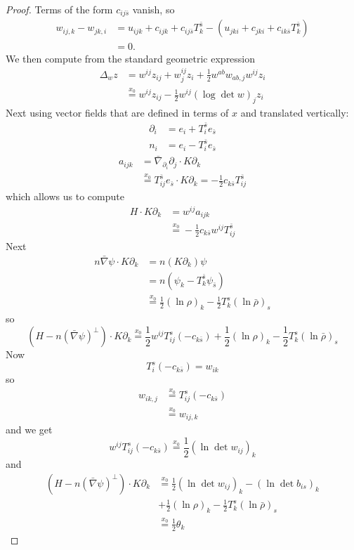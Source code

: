 \documentclass[12pt,letterpaper]{amsart}%
\numberwithin{mycounter}{section}
\theoremstyle{plain}
\numberwithin{equation}{section}
\theoremstyle{definition}
\begin{document}
\begin{proof}
Terms of the form $c_{ij\bar{s}}$ vanish, so
\begin{align*}
w_{ij,k}-w_{jk,i}  & =u_{ijk}+c_{ijk}+c_{ij\bar{s}}T_{k}^{\bar{s}}%
-(u_{jki}+c_{jki}+c_{ik\bar{s}}T_{k}^{\bar{s}})\\
& =0.
\end{align*}
We then compute from the standard geometric expression
\begin{align*}
\Delta_{w}z  & =w^{ij}z_{ij}+w_{j}^{ij}z_{i}+\frac{1}{2}w^{ab}w_{ab,j}%
w^{ij}z_{i}\\
& \overset{x_0}{=}w^{ij}z_{ij}-\frac{1}{2}w^{ij}\left(  \log\det w\right)  _{j}z_{i}%
\end{align*}
Next using vector fields that are
defined in terms of $x$ and translated vertically:
\begin{align*}
\partial_{i}  &  =e_{i}+T_{i}^{\bar{s}}e_{\bar{s}}\\
n_{i}  &  =e_{i}-T_{i}^{\bar{s}}e_{\bar{s}}%
\end{align*}
\begin{align*}
a_{ijk}  & =\bar{\nabla}_{\partial_{i}}\partial_{j}\cdot K\partial_{k}\\
& \overset{x_0}{=} T_{ij}^{\bar{s}}e_{\bar{s}}\cdot K\partial_{k}=-\frac{1}{2}c_{k\bar{s}%
}T_{ij}^{\bar{s}}%
\end{align*}
which allows us to compute
\begin{align*}
H\cdot K\partial_{k}  & =w^{ij}a_{ijk}\\
& \overset{x_0}{=}-\frac{1}{2}c_{k\bar{s}}w^{ij}T_{ij}^{\bar{s}}%
\end{align*}
Next%
\begin{align*}
n\bar{\nabla}\psi\cdot K\partial_{k}  & =n\left(  K\partial_{k}\right)
\psi\\
& =n\left(  \psi_{k}-T_{k}^{\bar{s}}\psi_{\bar{s}}\right)  \\
& \overset{x_0}{=}\frac{1}{2}\left(  \ln\rho\right)  _{k}-\frac{1}{2}T_{k}^{s}\left(  \ln
\bar{\rho}\right)  _{s}%
\end{align*}
so
\[
\left(  H-n\left(  \bar{\nabla}\psi\right)  ^{\perp}\right)  \cdot
K\partial_{k}\overset{x_0}{=}\frac{1}{2}w^{ij}T_{ij}^{s}(-c_{k\bar{s}})+\frac{1}{2}\left(
\ln\rho\right)  _{k}-\frac{1}{2}T_{k}^{s}\left(  \ln\bar{\rho}\right)  _{s}%
\]
Now
\[
T_{i}^{s}(-c_{k\bar{s}})=w_{ik}%
\]
so
\begin{align*}
w_{ik,j}  & \overset{x_0}{=}T_{ij}^{s}(-c_{k\bar{s}})\\
& \overset{x_0}{=}w_{ij,k}%
\end{align*}
and we get
\[
w^{ij}T_{ij}^{s}(-c_{k\bar{s}})\overset{x_0}{=}\frac{1}{2}\left(  \ln\det w_{ij}\right)  _{k}%
\]
and
\begin{align*}
\left(  H-n\left(  \bar{\nabla}\psi\right)  ^{\perp}\right)  \cdot
K\partial_{k}  & \overset{x_0}{=}\frac{1}{2}\left(  \ln\det w_{ij}\right)  _{k}-\left(
\ln\det b_{is}\right)  _{k}\\
& +\frac{1}{2}\left(  \ln\rho\right)  _{k}-\frac{1}{2}T_{k}^{s}\left(  \ln
\bar{\rho}\right)  _{s}\\
& \overset{x_0}{=}\frac{1}{2}\theta_{k}%
\end{align*}


\end{proof}
\end{document}
